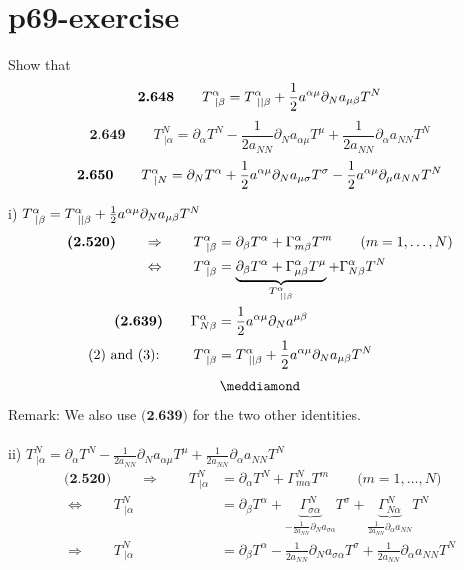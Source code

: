 \section{p69-exercise}
\begin{tcolorbox}
Show that
$$\textbf{2.648}\quad\quad T^{\alpha}_{\ |\beta} = T^{\alpha}_{\ ||\beta} + \frac{1}{2} a^{\alpha \mu} \partial_N a_{\mu\beta}T^N$$
$$\textbf{2.649}\quad\quad T^{N}_{\ |\alpha} = \partial_{\alpha}T^{N} - \frac{1}{2 a_{NN}} \partial_N a_{\alpha\mu}T^{\mu} + \frac{1}{2 a_{NN}} \partial_{\alpha} a_{NN}T^{N}$$
$$\textbf{2.650}\quad\quad T^{\alpha}_{\ |N} = \partial_{N}T^{\alpha}  + \frac{1}{2} a^{\alpha\mu} \partial_N a_{\mu\sigma}T^{\sigma} - \frac{1}{2} a^{\alpha\mu}  \partial_{\mu} a_{NN}T^{N}$$
\end{tcolorbox}
i) $T^{\alpha}_{\ |\beta} = T^{\alpha}_{\ ||\beta} + \half a^{\alpha \mu} \partial_N a_{\mu\beta}T^N$\\
\begin{align}
\textbf{(2.520)}\quad\quad \Rightarrow \quad\quad T^{\alpha}_{\ |\beta} &= \partial_{\beta}T^{\alpha}+\Gamma^{\alpha}_{m\beta}T^m \quad\quad\text{(}m = 1,\dots,N \text{)}\\
\Leftrightarrow \quad\quad T^{\alpha}_{\ |\beta} &= \underbrace{ \partial_{\beta}T^{\alpha}+ \Gamma^{\alpha}_{\mu \beta} T^{\mu}}_{T^{\alpha}_{ \ || \beta}} +\Gamma^{\alpha}_{N \beta}T^{N}\\
\textbf{(2.639)}\quad\quad \Gamma^{\alpha}_{N\beta} &= \frac{1}{2} a^{\alpha \mu}\partial_N a^{\mu \beta}\\
\text{(2) and (3): }\quad\quad T^{\alpha}_{\ |\beta} &= T^{\alpha}_{\ ||\beta} + \frac{1}{2} a^{\alpha \mu} \partial_N a_{\mu\beta}T^N
\end{align}
$$\meddiamond$$
Remark: We also use $\textbf{(2.639)}$ for the two other identities.\\\\
ii) $T^{N}_{\ |\alpha} = \partial_{\alpha}T^{N} - \frac{1}{2 a_{NN}} \partial_N a_{\alpha\mu}T^{\mu} + \frac{1}{2 a_{NN}} \partial_{\alpha} a_{NN}T^{N}$\\
\begin{align}
\textbf{(2.520)}\quad\quad \Rightarrow \quad\quad T^{N}_{\ |\alpha} &= \partial_{\alpha}T^{N}+\Gamma^{N}_{m\alpha}T^m \quad\quad\text{(}m = 1,\dots,N \text{)}\\
\Leftrightarrow \quad\quad T^{N}_{\ |\alpha} &=  \partial_{\beta}T^{\alpha}+ \underbrace{\Gamma^{N}_{\sigma \alpha}}_{ - \frac{1}{2a_{NN}}\partial_N a_{\sigma\alpha}} T^{\sigma } +\underbrace{\Gamma^{N}_{N \alpha}}_{ \frac{1}{2a_{NN}}\partial_{\alpha} a_{NN}}T^{N}\\
\Rightarrow \quad\quad T^{N}_{\ |\alpha} &=  \partial_{\beta}T^{\alpha} - \frac{1}{2a_{NN}}\partial_N a_{\sigma\alpha}T^{\sigma } +\frac{1}{2a_{NN}}\partial_{\alpha} a_{NN}T^{N}
\end{align}\\
